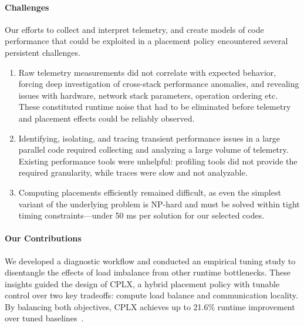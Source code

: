 \paragraph{Challenges}
Our efforts to collect and interpret telemetry, and create models of code performance that could be
exploited in a placement policy encountered several persistent challenges.

\begin{enumerate}
  \item Raw telemetry measurements did not correlate with expected behavior, forcing deep investigation of
        cross-stack performance anomalies, and revealing issues with hardware, network stack parameters, operation
        ordering etc.
        These constituted runtime noise that had to be eliminated before telemetry and placement effects
        could be reliably observed.
  \item Identifying, isolating, and tracing transient performance issues in a large parallel code required
        collecting and analyzing a large volume of telemetry.
        Existing performance tools were unhelpful: profiling tools did not provide the required
        granularity, while traces were slow and not analyzable.
  \item Computing placements efficiently remained difficult, as even
        the simplest variant of the underlying problem is NP-hard and must be solved within tight timing
        constraints---under 50 ms per solution for our selected codes.


\end{enumerate}

\paragraph{Our Contributions}
We developed a diagnostic workflow and conducted an empirical tuning study to disentangle the
effects of load imbalance from other runtime bottlenecks.
These insights guided the design of CPLX, a hybrid placement policy with tunable control over two
key tradeoffs: compute load balance and communication locality.
By balancing both objectives, CPLX achieves up to 21.6\% runtime improvement over tuned
baselines~\cite{Jain2025:AMR}.



